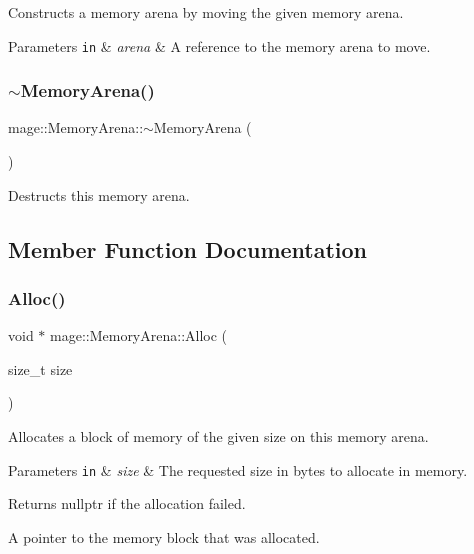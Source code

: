 Constructs a memory arena by moving the given memory arena.


\begin{DoxyParams}[1]{Parameters}
\mbox{\tt in}  & {\em arena} & A reference to the memory arena to move. \\
\hline
\end{DoxyParams}
\mbox{\label{classmage_1_1_memory_arena_acfee6fc205e2eaf6aeef4acf19948e6e}} 
\subsubsection{\texorpdfstring{$\sim$\+Memory\+Arena()}{~MemoryArena()}}
{\footnotesize\ttfamily mage\+::\+Memory\+Arena\+::$\sim$\+Memory\+Arena (\begin{DoxyParamCaption}{ }\end{DoxyParamCaption})}

Destructs this memory arena. 

\subsection{Member Function Documentation}
\mbox{\label{classmage_1_1_memory_arena_a2e63b11c535dbfefd69d071466be9ce1}} 
\subsubsection{\texorpdfstring{Alloc()}{Alloc()}}
{\footnotesize\ttfamily void $\ast$ mage\+::\+Memory\+Arena\+::\+Alloc (\begin{DoxyParamCaption}\item[{size\+\_\+t}]{size }\end{DoxyParamCaption})}

Allocates a block of memory of the given size on this memory arena.


\begin{DoxyParams}[1]{Parameters}
\mbox{\tt in}  & {\em size} & The requested size in bytes to allocate in memory. \\
\hline
\end{DoxyParams}
\begin{DoxyReturn}{Returns}
{\ttfamily nullptr} if the allocation failed. 

A pointer to the memory block that was allocated. 
\end{DoxyReturn}
\mbox{\label{classmage_1_1_memory_arena_a0880de049e8e76cd26918528eb892813}} 
